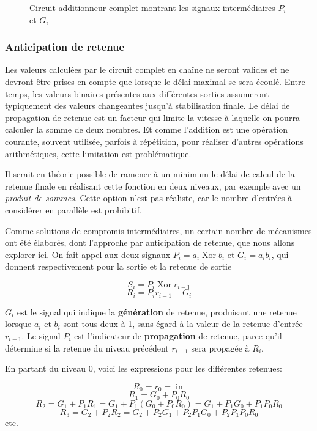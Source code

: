 \documentclass[11pt]{article}
\begin{document}
\begin{figure}[htbp]
\centering

\caption{\label{fig:org31dff4d}Circuit additionneur complet montrant les signaux intermédiaires \(P_i\) et \(G_i\)}
\end{figure}

\subsubsection{Anticipation de retenue}
\label{sec:orgb97c286}

Les valeurs calculées par le circuit complet en chaîne ne seront
valides et ne devront être prises en compte que lorsque le délai
maximal se sera écoulé. Entre temps, les valeurs binaires présentes
aux différentes sorties assumeront typiquement des valeurs changeantes
jusqu'à stabilisation finale. Le délai de propagation de retenue est
un facteur qui limite la vitesse à laquelle on pourra calculer la
somme de deux nombres. Et comme l'addition est une opération courante,
souvent utilisée, parfois à répétition, pour réaliser d'autres
opérations arithmétiques, cette limitation est problématique. 

Il serait en théorie possible de ramener à un minimum le délai de
calcul de la retenue finale en réalisant cette fonction en deux
niveaux, par exemple avec un \emph{produit de sommes}. Cette option n'est pas
réaliste, car le nombre d'entrées à considérer en parallèle est prohibitif.

Comme solutions de compromis intermédiaires, un certain nombre de
mécanismes ont été élaborés, dont l'approche par anticipation de
retenue, que nous allons explorer ici. On fait appel aux deux signaux
\(P_i = a_i \operatorname{Xor} b_i\) et \(G_i = a_i b_i\), qui donnent
respectivement pour la sortie et la retenue de sortie

$$ S_i = P_i \operatorname{Xor} r_{i-1} $$
$$ R_i = P_i r_{i-1} + G_i $$

\(G_i\) est le signal qui indique la \textbf{génération} de retenue,
produisant une retenue lorsque \(a_i\) et \(b_i\) sont tous deux à 1,
sans égard à la valeur de la retenue d'entrée \(r_{i-1}\). Le signal
\(P_i\) est l'indicateur de \textbf{propagation} de retenue, parce qu'il
détermine si la retenue du niveau précédent \(r_{i-1}\) sera propagée
à \(R_i\).

En partant du niveau 0, voici les expressions pour les différentes retenues:

$$ R_0 = r_0 = \operatorname{in}$$
$$ R_1 = G_0 + P_0 R_0 $$
$$ R_2 = G_1 + P_1 R_1 = G_1 + P_1 (G_0 + P_0 R_0) = G_1 + P_1 G_0 + P_1 P_0 R_0 $$
$$ R_3 = G_2 + P_2 R_2 = G_2 + P_2 G_1 + P_2 P_1 G_0 + P_2 P_1 P_0 R_0 $$
etc.
\end{document}

